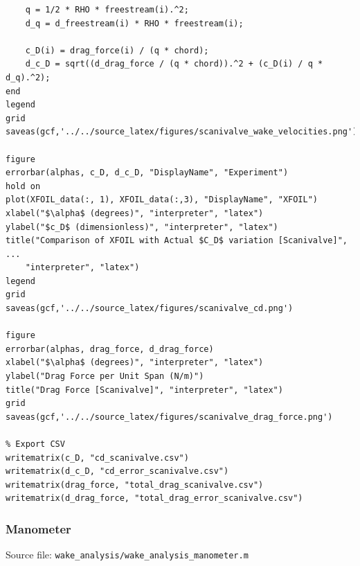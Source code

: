\documentclass[runningheads]{llncs}
\begin{document}
\begin{verbatim}
    q = 1/2 * RHO * freestream(i).^2;
    d_q = d_freestream(i) * RHO * freestream(i);
    
    c_D(i) = drag_force(i) / (q * chord);
    d_c_D = sqrt((d_drag_force / (q * chord)).^2 + (c_D(i) / q * d_q).^2);
end
legend
grid
saveas(gcf,'../../source_latex/figures/scanivalve_wake_velocities.png')

figure
errorbar(alphas, c_D, d_c_D, "DisplayName", "Experiment")
hold on
plot(XFOIL_data(:, 1), XFOIL_data(:,3), "DisplayName", "XFOIL")
xlabel("$\alpha$ (degrees)", "interpreter", "latex")
ylabel("$c_D$ (dimensionless)", "interpreter", "latex")
title("Comparison of XFOIL with Actual $C_D$ variation [Scanivalve]", ...
    "interpreter", "latex")
legend
grid
saveas(gcf,'../../source_latex/figures/scanivalve_cd.png')

figure
errorbar(alphas, drag_force, d_drag_force)
xlabel("$\alpha$ (degrees)", "interpreter", "latex")
ylabel("Drag Force per Unit Span (N/m)")
title("Drag Force [Scanivalve]", "interpreter", "latex")
grid
saveas(gcf,'../../source_latex/figures/scanivalve_drag_force.png')

% Export CSV
writematrix(c_D, "cd_scanivalve.csv")
writematrix(d_c_D, "cd_error_scanivalve.csv")
writematrix(drag_force, "total_drag_scanivalve.csv")
writematrix(d_drag_force, "total_drag_error_scanivalve.csv")
\end{verbatim}

\subsubsection{Manometer}

Source file: \verb|wake_analysis/wake_analysis_manometer.m|
\end{document}
